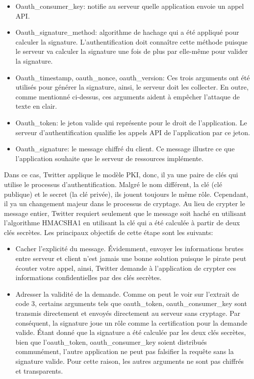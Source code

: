 \begin{itemize}
\item Oauth\_consumer\_key: notifie au serveur quelle application envoie un appel API.
\item Oauth\_signature\_method: algorithme de hachage qui a été appliqué pour calculer la signature. L'authentification doit connaître cette méthode puisque le serveur va calculer la signature une fois de plus par elle-même pour valider la signature.
\item Oauth\_timestamp, oauth\_nonce, oauth\_version: Ces trois arguments ont été utilisés pour générer la signature, ainsi, le serveur doit les collecter. En outre, comme mentionné ci-dessus, ces arguments aident à empêcher l'attaque de texte en clair.
\item Oauth\_token: le jeton valide qui représente pour le droit de l'application. Le serveur d'authentification qualifie les appels API de l'application par ce jeton.
\item Oauth\_signature: le message chiffré du client. Ce message illustre ce que l'application souhaite que le serveur de ressources implémente.
\end{itemize}
Dans ce cas, Twitter applique le modèle PKI, donc, il ya une paire de clés qui utilise le processus d'authentification. Malgré le nom différent, la clé (clé publique) et le secret (la clé privée), ils jouent toujours le même rôle. Cependant, il ya un changement majeur dans le processus de cryptage. Au lieu de crypter le message entier, Twitter requiert seulement que le message soit haché en utilisant l'algorithme HMACSHA1 en utilisant la clé qui a été calculée à partir de deux clés secrètes. Les principaux objectifs de cette étape sont les suivants:
\begin{itemize}
\item Cacher l'explicité du message. Évidemment, envoyer les informations brutes entre serveur et client n'est jamais une bonne solution puisque le pirate peut écouter votre appel, ainsi, Twitter demande à l'application de crypter ces informations confidentielles par des clés secrètes.
\item Adresser la validité de la demande. Comme on peut le voir sur l'extrait de code 3, certains arguments tels que oauth\_token, oauth\_consumer\_key sont transmis directement et envoyés directement au serveur sans cryptage. Par conséquent, la signature joue un rôle comme la certification pour la demande valide. Étant donné que la signature a été calculée par les deux clés secrètes, bien que l'oauth\_token, oauth\_consumer\_key soient distribués communément, l'autre application ne peut pas falsifier la requête sans la signature valide. Pour cette raison, les autres arguments ne sont pas chiffrés et transparents.
\end{itemize}

